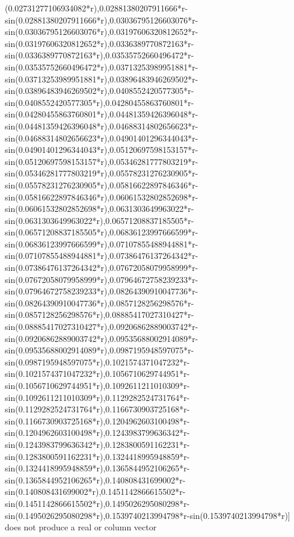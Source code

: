 \documentclass[12pt,arial,letterpaper]{book}
\begin{document}
\begin{eulernootebook}
\begin{eulercomment}
\begin{eulercomment}
\begin{eulernootebook}
\begin{eulercomment}
\begin{eulercomment}
\begin{eulercomment}
\begin{eulercomment}
\begin{eulercomment}
\begin{eulercomment}
\begin{eulernotebook}
\begin{eulercomment}
\begin{eulercomment}
\begin{eulercomment}
\begin{eulercomment}
\begin{eulercomment}
\begin{eulercomment}
\begin{eulercomment}
\begin{eulercomment}
\begin{eulercomment}
\begin{eulercomment}
\begin{eulercomment}
\begin{eulercomment}
\begin{eulercomment}
\begin{eulercomment}
\begin{eulercomment}
\begin{eulercomment}
\begin{euleroutput}
(0.02731277106934082*r),0.02881380207911666*r-sin(0.02881380207911666*r),0.03036795126603076*r-sin(0.03036795126603076*r),0.03197606320812652*r-sin(0.03197606320812652*r),0.0336389770872163*r-sin(0.0336389770872163*r),0.03535752660496472*r-sin(0.03535752660496472*r),0.03713253989951881*r-sin(0.03713253989951881*r),0.03896483946269502*r-sin(0.03896483946269502*r),0.0408552420577305*r-sin(0.0408552420577305*r),0.04280455863760801*r-sin(0.04280455863760801*r),0.04481359426396048*r-sin(0.04481359426396048*r),0.04688314802656623*r-sin(0.04688314802656623*r),0.04901401296344043*r-sin(0.04901401296344043*r),0.05120697598153157*r-sin(0.05120697598153157*r),0.05346281777803219*r-sin(0.05346281777803219*r),0.05578231276230905*r-sin(0.05578231276230905*r),0.05816622897846346*r-sin(0.05816622897846346*r),0.06061532802852698*r-sin(0.06061532802852698*r),0.0631303649963022*r-sin(0.0631303649963022*r),0.06571208837185505*r-sin(0.06571208837185505*r),0.06836123997666599*r-sin(0.06836123997666599*r),0.07107855488944881*r-sin(0.07107855488944881*r),0.07386476137264342*r-sin(0.07386476137264342*r),0.07672058079958999*r-sin(0.07672058079958999*r),0.07964672758239233*r-sin(0.07964672758239233*r),0.08264390910047736*r-sin(0.08264390910047736*r),0.0857128256298576*r-sin(0.0857128256298576*r),0.08885417027310427*r-sin(0.08885417027310427*r),0.09206862889003742*r-sin(0.09206862889003742*r),0.09535688002914089*r-sin(0.09535688002914089*r),0.0987195948597075*r-sin(0.0987195948597075*r),0.1021574371047232*r-sin(0.1021574371047232*r),0.1056710629744951*r-sin(0.1056710629744951*r),0.1092611211010309*r-sin(0.1092611211010309*r),0.1129282524731764*r-sin(0.1129282524731764*r),0.1166730903725168*r-sin(0.1166730903725168*r),0.1204962603100498*r-sin(0.1204962603100498*r),0.1243983799636342*r-sin(0.1243983799636342*r),0.1283800591162231*r-sin(0.1283800591162231*r),0.1324418995948859*r-sin(0.1324418995948859*r),0.1365844952106265*r-sin(0.1365844952106265*r),0.140808431699002*r-sin(0.140808431699002*r),0.1451142866615502*r-sin(0.1451142866615502*r),0.1495026295080298*r-sin(0.1495026295080298*r),0.1539740213994798*r-sin(0.1539740213994798*r)] does not produce a real or column vector
  

\end{euleroutput}
\end{eulercomment}
\end{eulercomment}
\end{eulercomment}
\end{eulercomment}
\end{eulercomment}
\end{eulercomment}
\end{eulercomment}
\end{eulercomment}
\end{eulercomment}
\end{eulercomment}
\end{eulercomment}
\end{eulercomment}
\end{eulercomment}
\end{eulercomment}
\end{eulercomment}
\end{eulercomment}
\end{eulernotebook}
\end{eulercomment}
\end{eulercomment}
\end{eulercomment}
\end{eulercomment}
\end{eulercomment}
\end{eulercomment}
\end{eulernootebook}
\end{eulercomment}
\end{eulercomment}
\end{eulernootebook}
\end{document}
